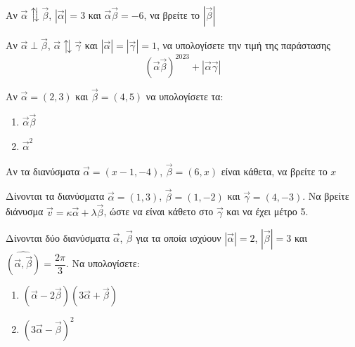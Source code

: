 \documentclass{../../presentation}
\begin{document}
\begin{askisi}
  Αν $\vec{α}\updownarrows\vec{β}$, $|\vec{α}|=3$ και $\vec{α}\vec{β}=-6$, να βρείτε το $|\vec{β}|$

\end{askisi}

\begin{askisi}
  Αν $\vec{α}\perp\vec{β}$, $\vec{α}\updownarrows\vec{γ}$ και $|\vec{α}|=|\vec{γ}|=1$, να υπολογίσετε την τιμή της παράστασης
  $$(\vec{α}\vec{β})^{2023}+|\vec{α}\vec{γ}|$$

\end{askisi}

\begin{askisi}
  Αν $\vec{α}=(2,3)$ και $\vec{β}=(4,5)$ να υπολογίσετε τα:
  \begin{enumerate}
    \item<1-> $\vec{α}\vec{β}$
    \item<2-> $\vec{α}^2$
  \end{enumerate}

\end{askisi}

\begin{askisi}
  Αν τα διανύσματα $\vec{α}=(x-1,-4)$, $\vec{β}=(6,x)$ είναι κάθετα, να βρείτε το $x$


\end{askisi}

\begin{askisi}
  Δίνονται τα διανύσματα $\vec{α}=(1,3)$, $\vec{β}=(1,-2)$ και $\vec{γ}=(4,-3)$. Να βρείτε διάνυσμα $\vec{v}=κ\vec{α}+λ\vec{β}$, ώστε να είναι κάθετο στο $\vec{γ}$ και να έχει μέτρο 5.


\end{askisi}

\begin{askisi}
  Δίνονται δύο διανύσματα $\vec{α}$, $\vec{β}$ για τα οποία ισχύουν $|\vec{α}|=2$, $|\vec{β}|=3$ και $\widehat{(\vec{α }, \vec{β })}=\dfrac{2\pi}{3}$. Να υπολογίσετε:
  \begin{enumerate}
    \item<1-> $(\vec{α}-2\vec{β})(3\vec{α}+\vec{β})$
    \item<2-> $(3\vec{α}-\vec{β})^2$
  \end{enumerate}


\end{askisi}
\end{document}

